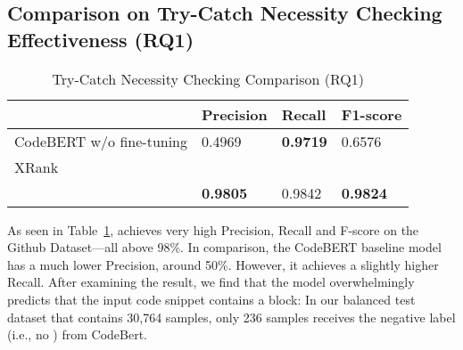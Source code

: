 \subsection{Comparison on Try-Catch Necessity Checking Effectiveness (RQ1)}

\begin{table}[t]%
  \caption{Try-Catch Necessity Checking Comparison (RQ1)}
  \vspace{-12pt}
  \small
	\begin{center}
		\renewcommand{\arraystretch}{1}
		\begin{tabular}{| p{3.05cm}<{\centering} | p{1.2cm}<{\centering} | p{1.2cm}<{\centering}| p{1.2cm}<{\centering}|}
		  \hline
			  & Precision  &  Recall & F1-score \\
			\hline
			CodeBERT w/o fine-tuning & 0.4969  & \textbf{0.9719}   & 0.6576\\
			\hline
			XRank &  &  & \\
			\hline
			\tool   &  \textbf{0.9805} &  0.9842 & \textbf{0.9824}\\
			\hline
		\end{tabular}
		\label{tab:xblock}
	\end{center}
\end{table}






As seen in Table~\ref{tab:xblock}, {\tool} achieves very high
Precision, Recall and F-score on the Github Dataset---all above
98\%. In comparison, the CodeBERT baseline model has a much lower
Precision, around 50\%.
However, it achieves a slightly higher Recall. After examining the
result, we find that the model overwhelmingly predicts that the input
code snippet contains a  block: In our balanced test
dataset that contains 30,764 samples, only 236 samples receives the
negative label (i.e., no ) from CodeBert.



